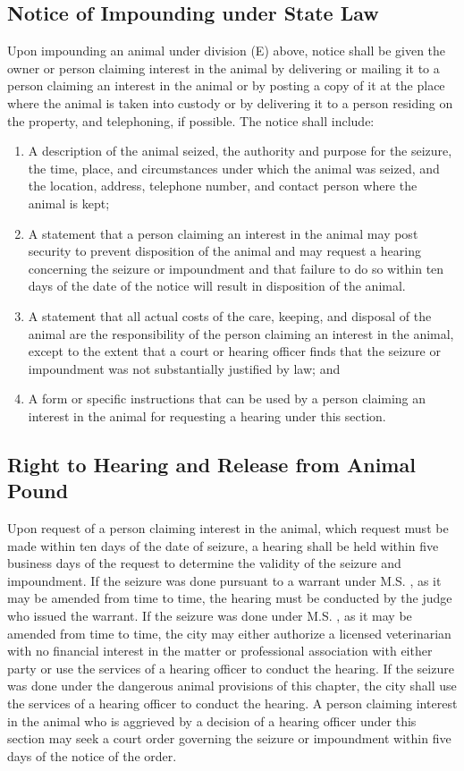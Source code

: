 \subsection{Notice of Impounding under State Law}
Upon impounding an animal under division (E) above, notice shall be given the owner or person claiming interest in the animal by delivering or mailing it to a person claiming an interest in the animal or by posting a copy of it at the place where the animal is taken into custody or by delivering it to a person residing on the property, and telephoning, if possible. The notice shall include:
\begin{enumerate}[{\indent}1)]
    \item A description of the animal seized, the authority and purpose for the seizure, the time, place, and circumstances under which the animal was seized, and the location, address, telephone number, and contact person where the animal is kept;
    \item A statement that a person claiming an interest in the animal may post security to prevent disposition of the animal and may request a hearing concerning the seizure or impoundment and that failure to do so within ten days of the date of the notice will result in disposition of the animal.
    \item A statement that all actual costs of the care, keeping, and disposal of the animal are the responsibility of the person claiming an interest in the animal, except to the extent that a court or hearing officer finds that the seizure or impoundment was not substantially justified by law; and
    \item A form or specific instructions that can be used by a person claiming an interest in the animal for requesting a hearing under this section.
\end{enumerate}
\subsection{Right to Hearing and Release from Animal Pound}
Upon request of a person claiming interest in the animal, which request must be made within ten days of the date of seizure, a hearing shall be held within five business days of the request to determine the validity of the seizure and impoundment.  If the seizure was done pursuant to a warrant under M.S. , as it may be amended from time to time, the hearing must be conducted by the judge who issued the warrant.  If the seizure was done under M.S. , as it may be amended from time to time, the city may either authorize a licensed veterinarian with no financial interest in the matter or professional association with either party or use the services of a hearing officer to conduct the hearing.  If the seizure was done under the dangerous animal provisions of this chapter, the city shall use the services of a hearing officer to conduct the hearing.  A person claiming interest in the animal who is aggrieved by a decision of a hearing officer under this section may seek a court order governing the seizure or impoundment within five days of the notice of the order.
